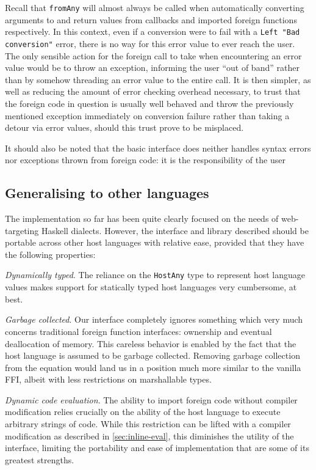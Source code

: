 \documentclass{sigplanconf}
\begin{document}
Recall that \lstinline!fromAny! will almost always be called when
automatically converting arguments to and return values from callbacks and
imported foreign functions respectively. In this context, even if a conversion
were to fail with a \lstinline!Left "Bad conversion"! error, there is no way
for this error value to ever reach the user. The only sensible action for the
foreign call to take when encountering an error value would be to throw an
exception, informing the user ``out of band'' rather than by somehow threading
an error value to the entire call.
It is then simpler, as well as reducing the amount of error checking overhead
necessary, to trust that the foreign code in question is usually well behaved
and throw the previously mentioned exception immediately on conversion failure
rather than taking a detour via error values,
should this trust prove to be misplaced.

It should also be noted that the basic interface does neither handles syntax
errors nor exceptions thrown from foreign code: it is the responsibility of
the user 

\subsection{Generalising to other languages}
\label{sec:generalising}
The implementation so far has been quite clearly focused on the needs of
web-targeting Haskell dialects. However, the interface and library described
should be portable across other host languages with relative ease, provided
that they have the following properties:

\emph{Dynamically typed}. The reliance on the
\lstinline!HostAny! type to represent host language values makes support for
statically typed host languages very cumbersome, at best.

\emph{Garbage collected}. Our interface completely ignores something which
very much concerns traditional foreign function interfaces: ownership and
eventual deallocation of memory. This careless behavior is enabled by the
fact that the host language is assumed to be garbage collected. Removing
garbage collection from the equation would land us in a position much
more similar to the vanilla FFI, albeit with less restrictions on
marshallable types.

\emph{Dynamic code evaluation}. The ability to import foreign code without
compiler modification relies crucially on the ability of the host language
to execute arbitrary strings of code. While this restriction can be lifted
with a compiler modification as described in \ref{sec:inline-eval}, this
diminishes the utility of the interface, limiting the portability and
ease of implementation that are some of its greatest strengths.
\end{document}
